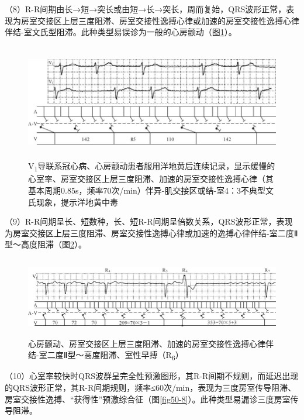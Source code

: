 （8）R-R间期由长→短→突长或由短→长→突长，周而复始，QRS波形正常，表现为房室交接区上层三度阻滞、房室交接性逸搏心律或加速的房室交接性逸搏心律伴结-室文氏型阻滞。此种类型易误诊为一般的心房颤动（图\ref{fig13-20}）。

\begin{figure}[!htbp]
 \centering
 \includegraphics[width=5.80208in,height=1.98958in]{./images/Image00228.jpg}
 \captionsetup{justification=centering}
 \caption{V\textsubscript{1}导联系冠心病、心房颤动患者服用洋地黄后连续记录，显示缓慢的心室率、房室交接区上层三度阻滞、加速的房室交接性逸搏心律（其基本周期0.85s，频率70次/min）伴异-肌交接区或结-室4：3不典型文氏现象，提示洋地黄中毒}
 \label{fig13-20}
  \end{figure} 


（9）R-R间期呈长、短数种，长、短R-R间期呈倍数关系，QRS波形正常，表现为房室交接区上层三度阻滞、房室交接性逸搏心律或加速的逸搏心律伴结-室二度Ⅱ型～高度阻滞（图\ref{fig13-21}）。

\begin{figure}[!htbp]
 \centering
 \includegraphics[width=5.73958in,height=1.36458in]{./images/Image00229.jpg}
 \captionsetup{justification=centering}
 \caption{心房颤动、房室交接区上层三度阻滞、加速的房室交接性逸搏心律伴结-室二度Ⅱ型～高度阻滞、室性早搏（R\textsubscript{6}）}
 \label{fig13-21}
  \end{figure} 


（10）心室率较快时QRS波群呈完全性预激图形，其R-R间期不规则，而延迟出现的QRS波形正常，其R-R间期规则，频率≤60次/min，表现为三度房室传导阻滞、房室交接性逸搏、“获得性”预激综合征（图\ref{fig50-8}）。此种类型易漏诊三度房室传导阻滞。

\protect\hypertarget{text00020.htmlux5cux23subid205}{}{}

